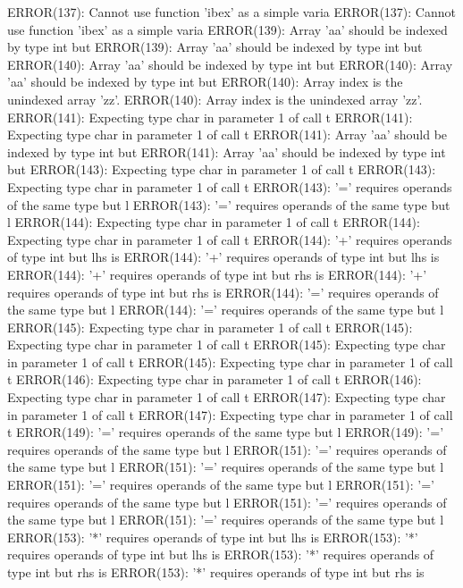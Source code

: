 \documentclass[12pt]{book}
\begin{document}
ERROR(137): Cannot use function 'ibex' as a simple varia        ERROR(137): Cannot use function 'ibex' as a simple varia
ERROR(139): Array 'aa' should be indexed by type int but        ERROR(139): Array 'aa' should be indexed by type int but
ERROR(140): Array 'aa' should be indexed by type int but        ERROR(140): Array 'aa' should be indexed by type int but
ERROR(140): Array index is the unindexed array 'zz'.                ERROR(140): Array index is the unindexed array 'zz'.
ERROR(141): Expecting type char in parameter 1 of call t        ERROR(141): Expecting type char in parameter 1 of call t
ERROR(141): Array 'aa' should be indexed by type int but        ERROR(141): Array 'aa' should be indexed by type int but
ERROR(143): Expecting type char in parameter 1 of call t        ERROR(143): Expecting type char in parameter 1 of call t
ERROR(143): '=' requires operands of the same type but l        ERROR(143): '=' requires operands of the same type but l
ERROR(144): Expecting type char in parameter 1 of call t        ERROR(144): Expecting type char in parameter 1 of call t
ERROR(144): '+' requires operands of type int but lhs is        ERROR(144): '+' requires operands of type int but lhs is
ERROR(144): '+' requires operands of type int but rhs is        ERROR(144): '+' requires operands of type int but rhs is
ERROR(144): '=' requires operands of the same type but l        ERROR(144): '=' requires operands of the same type but l
ERROR(145): Expecting type char in parameter 1 of call t        ERROR(145): Expecting type char in parameter 1 of call t
ERROR(145): Expecting type char in parameter 1 of call t        ERROR(145): Expecting type char in parameter 1 of call t
ERROR(146): Expecting type char in parameter 1 of call t        ERROR(146): Expecting type char in parameter 1 of call t
ERROR(147): Expecting type char in parameter 1 of call t        ERROR(147): Expecting type char in parameter 1 of call t
ERROR(149): '=' requires operands of the same type but l        ERROR(149): '=' requires operands of the same type but l
ERROR(151): '=' requires operands of the same type but l        ERROR(151): '=' requires operands of the same type but l
ERROR(151): '=' requires operands of the same type but l        ERROR(151): '=' requires operands of the same type but l
ERROR(151): '=' requires operands of the same type but l        ERROR(151): '=' requires operands of the same type but l
ERROR(153): '*' requires operands of type int but lhs is        ERROR(153): '*' requires operands of type int but lhs is
ERROR(153): '*' requires operands of type int but rhs is        ERROR(153): '*' requires operands of type int but rhs is
\end{document}
